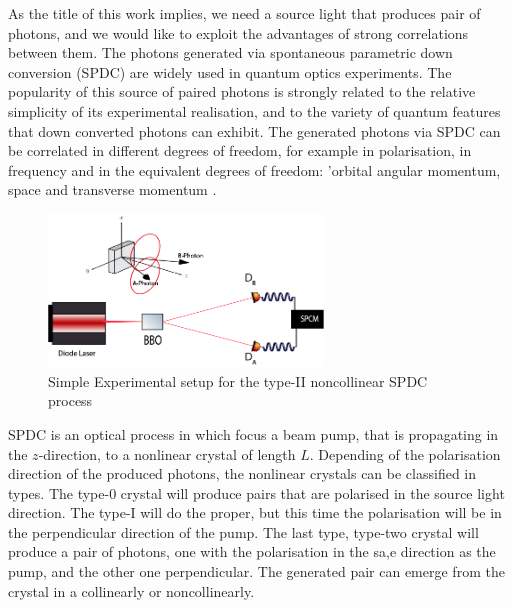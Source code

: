 As the title of this work implies, we need a source light that produces pair of photons, 
and we would like to exploit the advantages of strong correlations between them.
The photons generated via spontaneous parametric down conversion (SPDC) are
widely used in quantum optics experiments. The popularity of this source of paired
photons is strongly related to the relative simplicity of its experimental
realisation, and to the variety of quantum features that down converted photons can exhibit. 
The generated photons via SPDC can be correlated in different degrees of freedom, for example 
in polarisation, in frequency and in the equivalent degrees of freedom: 
'orbital angular momentum, space and transverse momentum \cite{spatiocorrelations}.\\

\begin{figure}[h!]
\centering
\label{fig:spdcSimple}
 \includegraphics[width=0.65\textwidth]{Figures/spdcSimple.png}
 \caption{Simple Experimental setup for the type-II noncollinear SPDC process} 
\end{figure}


SPDC is an optical process in which focus a beam pump, that is 
propagating in the $z$-direction, to a nonlinear crystal of length $L$. Depending of the polarisation
direction of the produced photons, the nonlinear crystals can be classified in types. The type-0 crystal will 
produce pairs that are polarised in the source light direction. The type-I will do the proper, but this time the polarisation will be in the 
perpendicular direction of the pump. The last type, type-two crystal will produce a pair of photons, 
one with the polarisation in the sa,e direction as the pump, and the other one perpendicular. 
The generated pair can emerge from the crystal in a collinearly or noncollinearly.


